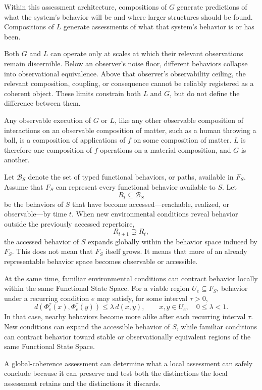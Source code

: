 \documentclass[11pt]{article}
\theoremstyle{definition}
\begin{document}
Within this assessment architecture, compositions of $G$ generate predictions of what the system's behavior will be and where larger structures should be found. Compositions of $L$ generate assessments of what that system's behavior is or has been.

Both $G$ and $L$ can operate only at scales at which their relevant observations remain discernible. Below an observer's noise floor, different behaviors collapse into observational equivalence. Above that observer's observability ceiling, the relevant composition, coupling, or consequence cannot be reliably registered as a coherent object. These limits constrain both $L$ and $G$, but do not define the difference between them.

Any observable execution of $G$ or $L$, like any other observable composition of interactions on an observable composition of matter, such as a human throwing a ball, is a composition of applications of $f$ on some composition of matter. $L$ is therefore one composition of $f$-operations on a material composition, and $G$ is another.

Let $\mathcal{B}_S$ denote the set of typed functional behaviors, or paths, available in $F_S$. Assume that $F_S$ can represent every functional behavior available to $S$. Let
\[
R_t \subseteq \mathcal{B}_S
\]
be the behaviors of $S$ that have become accessed---reachable, realized, or observable---by time $t$. When new environmental conditions reveal behavior outside the previously accessed repertoire,
\[
R_{t+1} \supsetneq R_t,
\]
the accessed behavior of $S$ expands globally within the behavior space induced by $F_S$. This does not mean that $F_S$ itself grows. It means that more of an already representable behavior space becomes observable or accessible.

At the same time, familiar environmental conditions can contract behavior locally within the same Functional State Space. For a viable region $U_e \subseteq F_S$, behavior under a recurring condition $e$ may satisfy, for some interval $\tau > 0$,
\[
d\!\left(\Phi_e^\tau(x),\Phi_e^\tau(y)\right)
\leq
\lambda\, d(x,y),
\qquad
x,y \in U_e,
\quad
0 \leq \lambda < 1.
\]
In that case, nearby behaviors become more alike after each recurring interval $\tau$. New conditions can expand the accessible behavior of $S$, while familiar conditions can contract behavior toward stable or observationally equivalent regions of the same Functional State Space.

A global-coherence assessment can determine what a local assessment can safely conclude because it can preserve and test both the distinctions the local assessment retains and the distinctions it discards.
\end{document}
